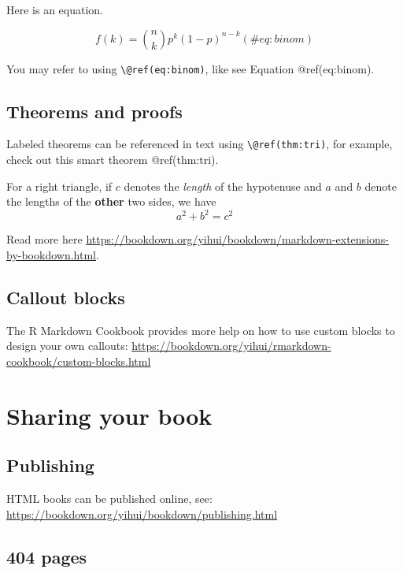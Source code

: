 \documentclass[
]{book}
\begin{document}
Here is an equation.

\begin{equation} 
  f\left(k\right) = \binom{n}{k} p^k\left(1-p\right)^{n-k}
  (\#eq:binom)
\end{equation}

You may refer to using \texttt{\textbackslash{}@ref(eq:binom)}, like see
Equation @ref(eq:binom).

\hypertarget{theorems-and-proofs}{%
\section{Theorems and proofs}\label{theorems-and-proofs}}

Labeled theorems can be referenced in text using
\texttt{\textbackslash{}@ref(thm:tri)}, for example, check out this
smart theorem @ref(thm:tri).

\leavevmode{}%
For a right triangle, if \(c\) denotes the \emph{length} of the
hypotenuse and \(a\) and \(b\) denote the lengths of the \textbf{other}
two sides, we have \[a^2 + b^2 = c^2\]

Read more here
\url{https://bookdown.org/yihui/bookdown/markdown-extensions-by-bookdown.html}.

\hypertarget{callout-blocks}{%
\section{Callout blocks}\label{callout-blocks}}

The R Markdown Cookbook provides more help on how to use custom blocks
to design your own callouts:
\url{https://bookdown.org/yihui/rmarkdown-cookbook/custom-blocks.html}

\hypertarget{sharing-your-book}{%
\chapter{Sharing your book}\label{sharing-your-book}}

\hypertarget{publishing}{%
\section{Publishing}\label{publishing}}

HTML books can be published online, see:
\url{https://bookdown.org/yihui/bookdown/publishing.html}

\hypertarget{pages}{%
\section{404 pages}\label{pages}}
\end{document}
